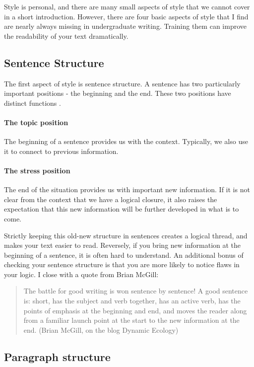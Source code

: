 \documentclass{tufte-book}
\begin{document}
Style is personal, and there are many small aspects of style that we cannot cover in a short introduction. However, there are four basic aspects of style that I find are nearly always missing in undergraduate writing. Training them can improve the readability of your text dramatically.

\subsection{Sentence Structure}

The first aspect of style is sentence structure. A sentence has two particularly important positions - the  beginning and the end. These two positions have distinct functions \citep{Gopen-ScienceOfScientific-1990,Tischler-Scientificwritingbooklet-1978}.

\paragraph{The topic position} The beginning of a sentence provides us with the context. Typically, we also use it to connect to previous information.

\paragraph{The stress position} The end of the situation provides us with important new information. If it is not clear from the context that we have a logical closure, it also raises the expectation that this new information will be further developed in what is to come.

Strictly keeping this old-new structure in sentences creates a logical thread, and makes your text easier to read. Reversely, if you bring new information at the beginning of a sentence, it is often hard to understand. An additional bonus of checking your sentence structure is that you are more likely to notice flaws in your logic. I close with a quote from Brian McGill:


\begin{quote}
The battle for good writing is won sentence by sentence! A good sentence is: short, has the subject and verb together, has an active verb, has the points of emphasis at the beginning and end, and moves the reader along from a familiar launch point at the start to the new information at the end. (Brian McGill, on the blog Dynamic Ecology)
\end{quote}


\subsection{Paragraph structure}
\end{document}
